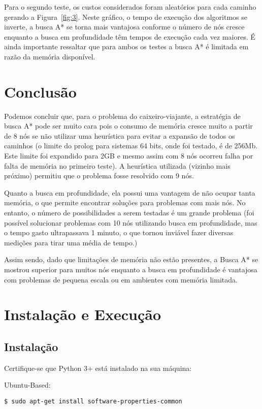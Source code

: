 \documentclass[12pt,a4paper]{article}
\begin{document}
Para o segundo teste, os custos considerados foram aleatórios para cada caminho gerando a Figura~\ref{fig:3}. Neste gráfico, o  tempo de execução dos algoritmos se inverte, a busca A* se torna mais vantajosa conforme o número de nós cresce enquanto a busca em profundidade têm tempos de execução cada vez maiores.
É ainda importante ressaltar que para ambos os testes a busca A* é limitada em razão da memória disponível.

\newpage
\section{Conclusão}
	Podemos concluir que, para o problema do caixeiro-viajante, a estratégia de busca A* pode ser muito cara pois o consumo de memória cresce muito a partir de 8 nós se não utilizar uma heurística para evitar a expansão de todos os caminhos (o limite do prolog para sistemas 64 bits, onde foi testado, é de 256Mb. Este limite foi expandido para 2GB e mesmo assim com 8 nós ocorreu falha por falta de memória no primeiro teste). A heurística utilizada (vizinho mais próximo) permitiu que o problema fosse resolvido com 9 nós.

	Quanto a busca em profundidade, ela possui uma vantagem de não ocupar tanta memória, o que permite encontrar soluções para problemas com mais nós. No entanto, o número de possibilidades a serem testadas é um grande problema (foi possível solucionar problemas com 10 nós utilizando busca em profundidade, mas o tempo gasto ultrapassava 1 minuto, o que tornou inviável fazer diversas medições para tirar uma média de tempo.)

  Assim sendo, dado que limitações de memória não estão presentes, a Busca A* se mostrou superior para muitos nós enquanto a busca em profundidade é vantajosa com problemas de pequena escala ou em ambientes com memória limitada.
\appendix

\section{Instalação e Execução}
\subsection{Instalação}
Certifique-se que Python 3+ está instalado na sua máquina:

Ubuntu-Based:
\begin{verbatim}
$ sudo apt-get install software-properties-common 
\end{verbatim}
\end{document}
